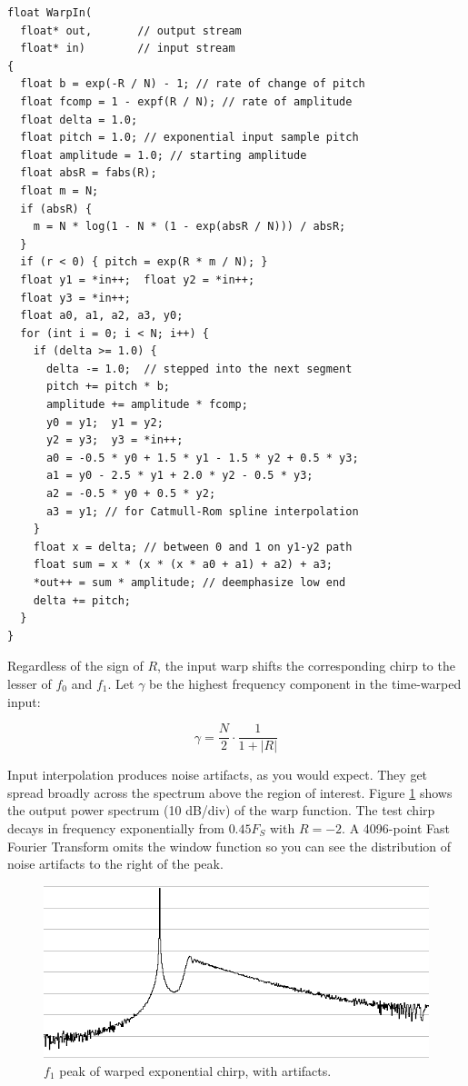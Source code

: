 \begin{lstlisting}[float,floatplacement=H]
float WarpIn(
  float* out,       // output stream
  float* in)        // input stream
{
  float b = exp(-R / N) - 1; // rate of change of pitch
  float fcomp = 1 - expf(R / N); // rate of amplitude 
  float delta = 1.0;
  float pitch = 1.0; // exponential input sample pitch
  float amplitude = 1.0; // starting amplitude
  float absR = fabs(R);
  float m = N;
  if (absR) {
    m = N * log(1 - N * (1 - exp(absR / N))) / absR;
  }
  if (r < 0) { pitch = exp(R * m / N); }
  float y1 = *in++;  float y2 = *in++;
  float y3 = *in++;
  float a0, a1, a2, a3, y0;
  for (int i = 0; i < N; i++) {
    if (delta >= 1.0) {
      delta -= 1.0;  // stepped into the next segment
      pitch += pitch * b;
      amplitude += amplitude * fcomp;
      y0 = y1;  y1 = y2;
      y2 = y3;  y3 = *in++;
      a0 = -0.5 * y0 + 1.5 * y1 - 1.5 * y2 + 0.5 * y3;
      a1 = y0 - 2.5 * y1 + 2.0 * y2 - 0.5 * y3;
      a2 = -0.5 * y0 + 0.5 * y2;
      a3 = y1; // for Catmull-Rom spline interpolation
    }
    float x = delta; // between 0 and 1 on y1-y2 path
    float sum = x * (x * (x * a0 + a1) + a2) + a3;
    *out++ = sum * amplitude; // deemphasize low end
    delta += pitch;
  }
}
\end{lstlisting}

Regardless of the sign of $R$, the input warp shifts the corresponding chirp
to the lesser of $f_0$ and $f_1$. 
Let $\gamma$ be the highest frequency component in the time-warped input:

\begin{equation} \label{eq:gamma}
\gamma = \frac{N}{2} \cdot \frac{1}{1 + |R|}
\end{equation}

Input interpolation produces noise artifacts, as you would expect.
They get spread broadly across the spectrum above the region of interest.
Figure \ref{fig:inwarpspec} shows the output power spectrum (10 dB/div) of
the warp function. The test chirp decays in frequency exponentially from
$0.45 F_S$ with $R=-2$.
A 4096-point Fast Fourier Transform omits the window function so you can
see the distribution of noise artifacts to the right of the peak.

\begin{figure}
  \includegraphics[width=\linewidth]{../source/inwarpspec.png}
  \caption{$f_1$ peak of warped exponential chirp, with artifacts.}
  \label{fig:inwarpspec}
\end{figure}

